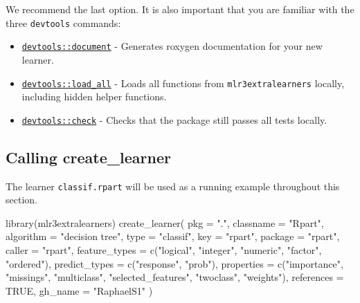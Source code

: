 \documentclass[
]{scrbook}
\newenvironment{Shaded}{\begin{snugshade}}{\end{snugshade}}
\newcommand{\AttributeTok}[1]{\textcolor[rgb]{0.77,0.63,0.00}{#1}}
\newcommand{\ConstantTok}[1]{\textcolor[rgb]{0.00,0.00,0.00}{#1}}
\newcommand{\FunctionTok}[1]{\textcolor[rgb]{0.00,0.00,0.00}{#1}}
\newcommand{\NormalTok}[1]{#1}
\newcommand{\StringTok}[1]{\textcolor[rgb]{0.31,0.60,0.02}{#1}}
\providecommand{\tightlist}{%
  \setlength{\itemsep}{0pt}\setlength{\parskip}{0pt}}
\renewenvironment{Shaded} {\begin{snugshade}\small} {\end{snugshade}}
\begin{document}
We recommend the last option. It is also important that you are familiar with the three \texttt{devtools} commands:

\begin{itemize}
\tightlist
\item
  \href{https://www.rdocumentation.org/packages/devtools/topics/document}{\texttt{devtools::document}} - Generates roxygen documentation for your new learner.
\item
  \href{https://www.rdocumentation.org/packages/devtools/topics/load_all}{\texttt{devtools::load\_all}} - Loads all functions from \texttt{mlr3extralearners} locally, including hidden helper functions.
\item
  \href{https://www.rdocumentation.org/packages/devtools/topics/check}{\texttt{devtools::check}} - Checks that the package still passes all tests locally.
\end{itemize}

\hypertarget{create-learner}{%
\subsection{Calling create\_learner}\label{create-learner}}

The learner \texttt{classif.rpart} will be used as a running example throughout this section.

\begin{Shaded}
\begin{Highlighting}[]
\FunctionTok{library}\NormalTok{(mlr3extralearners)}
\FunctionTok{create\_learner}\NormalTok{(}
  \AttributeTok{pkg =} \StringTok{"."}\NormalTok{,}
  \AttributeTok{classname =} \StringTok{"Rpart"}\NormalTok{,}
  \AttributeTok{algorithm =} \StringTok{"decision tree"}\NormalTok{,}
  \AttributeTok{type =} \StringTok{"classif"}\NormalTok{,}
  \AttributeTok{key =} \StringTok{"rpart"}\NormalTok{,}
  \AttributeTok{package =} \StringTok{"rpart"}\NormalTok{,}
  \AttributeTok{caller =} \StringTok{"rpart"}\NormalTok{,}
  \AttributeTok{feature\_types =} \FunctionTok{c}\NormalTok{(}\StringTok{"logical"}\NormalTok{, }\StringTok{"integer"}\NormalTok{, }\StringTok{"numeric"}\NormalTok{, }\StringTok{"factor"}\NormalTok{, }\StringTok{"ordered"}\NormalTok{),}
  \AttributeTok{predict\_types =} \FunctionTok{c}\NormalTok{(}\StringTok{"response"}\NormalTok{, }\StringTok{"prob"}\NormalTok{),}
  \AttributeTok{properties =} \FunctionTok{c}\NormalTok{(}\StringTok{"importance"}\NormalTok{, }\StringTok{"missings"}\NormalTok{, }\StringTok{"multiclass"}\NormalTok{, }\StringTok{"selected\_features"}\NormalTok{, }\StringTok{"twoclass"}\NormalTok{, }\StringTok{"weights"}\NormalTok{),}
  \AttributeTok{references =} \ConstantTok{TRUE}\NormalTok{,}
  \AttributeTok{gh\_name =} \StringTok{"RaphaelS1"}
\NormalTok{)}
\end{Highlighting}
\end{Shaded}
\end{document}
